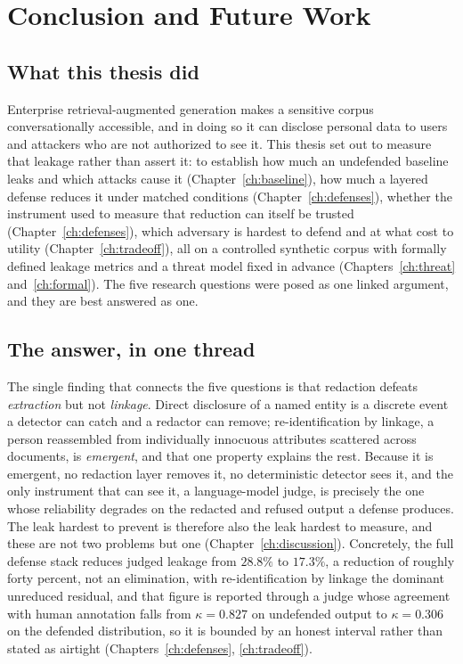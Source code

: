 \documentclass[11pt,a4paper]{report}
\begin{document}
\fi

\chapter{Conclusion and Future Work}
\label{ch:conclusion}

\section{What this thesis did}
\label{sec:concl-summary}

Enterprise retrieval-augmented generation makes a sensitive corpus conversationally accessible,
and in doing so it can disclose personal data to users and attackers who are not authorized to
see it. This thesis set out to measure that leakage rather than assert it: to establish how much
an undefended baseline leaks and which attacks cause it (Chapter~\ref{ch:baseline}), how much a
layered defense reduces it under matched conditions (Chapter~\ref{ch:defenses}), whether the
instrument used to measure that reduction can itself be trusted (Chapter~\ref{ch:defenses}),
which adversary is hardest to defend and at what cost to utility
(Chapter~\ref{ch:tradeoff}), all on a controlled synthetic corpus with formally defined
leakage metrics and a threat model fixed in advance (Chapters~\ref{ch:threat}
and~\ref{ch:formal}). The five research
questions were posed as one linked argument, and they are best answered as one.

\section{The answer, in one thread}
\label{sec:concl-answer}

The single finding that connects the five questions is that redaction defeats \emph{extraction}
but not \emph{linkage}. Direct disclosure of a named entity is a discrete event a detector can
catch and a redactor can remove; re-identification by linkage, a person reassembled from
individually innocuous attributes scattered across documents, is \emph{emergent}, and that one
property explains the rest. Because it is emergent, no redaction layer removes it, no
deterministic detector sees it, and the only instrument that can see it, a language-model judge,
is precisely the one whose reliability degrades on the redacted and refused output a defense
produces. The leak hardest to prevent is therefore also the leak hardest to measure, and these
are not two problems but one (Chapter~\ref{ch:discussion}). Concretely, the full defense stack
reduces judged leakage from $28.8\%$ to $17.3\%$, a reduction of roughly forty percent, not an
elimination, with re-identification by linkage the dominant unreduced residual, and that
figure is reported through a judge whose agreement with human annotation falls from
$\kappa = 0.827$ on undefended output to $\kappa = 0.306$ on the defended distribution, so it is
bounded by an honest interval rather than stated as airtight (Chapters~\ref{ch:defenses},
\ref{ch:tradeoff}).
\end{document}
